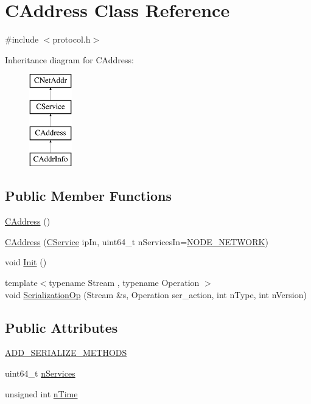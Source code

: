 \hypertarget{class_c_address}{}\section{C\+Address Class Reference}
\label{class_c_address}


{\ttfamily \#include $<$protocol.\+h$>$}

Inheritance diagram for C\+Address\+:\begin{figure}[H]
\begin{center}
\leavevmode
\includegraphics[height=4.000000cm]{class_c_address}
\end{center}
\end{figure}
\subsection*{Public Member Functions}
\begin{DoxyCompactItemize}
\item 
\mbox{\hyperlink{class_c_address_a84cd336180580ab69b8888a4339ccc37}{C\+Address}} ()
\item 
\mbox{\hyperlink{class_c_address_a806e75f363ec49bfab92a686a8774ac3}{C\+Address}} (\mbox{\hyperlink{class_c_service}{C\+Service}} ip\+In, uint64\+\_\+t n\+Services\+In=\mbox{\hyperlink{protocol_8h_a726ca809ffd3d67ab4b8476646f26635a9d1154f0e7e56f183a5c8373abe2e86c}{N\+O\+D\+E\+\_\+\+N\+E\+T\+W\+O\+RK}})
\item 
void \mbox{\hyperlink{class_c_address_ac060c84dcf47b8ccfae0142c9b29a243}{Init}} ()
\item 
{\footnotesize template$<$typename Stream , typename Operation $>$ }\\void \mbox{\hyperlink{class_c_address_aec10c7075404eefbcf6f7a4c5671be02}{Serialization\+Op}} (Stream \&s, Operation ser\+\_\+action, int n\+Type, int n\+Version)
\end{DoxyCompactItemize}
\subsection*{Public Attributes}
\begin{DoxyCompactItemize}
\item 
\mbox{\hyperlink{class_c_address_a9582fc22433b2ed275d4b65fb72551e7}{A\+D\+D\+\_\+\+S\+E\+R\+I\+A\+L\+I\+Z\+E\+\_\+\+M\+E\+T\+H\+O\+DS}}
\item 
uint64\+\_\+t \mbox{\hyperlink{class_c_address_a6a4a6aa020d0d558f238c7d04dd986c3}{n\+Services}}
\item 
unsigned int \mbox{\hyperlink{class_c_address_ac1c44aac968b11f90ce529b133ae4e9b}{n\+Time}}
\end{DoxyCompactItemize}
